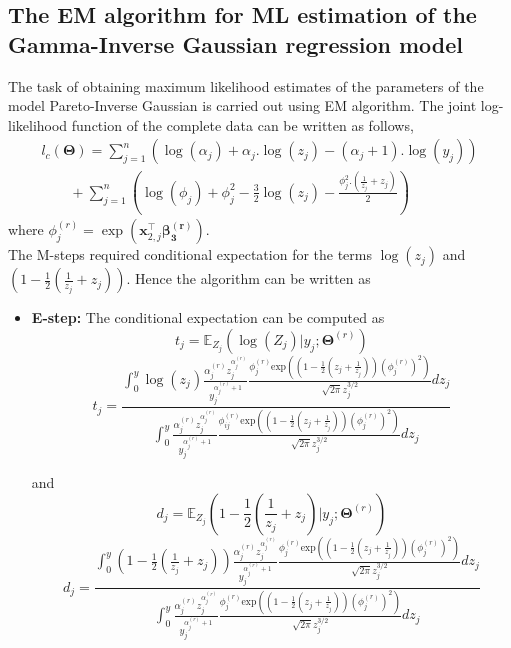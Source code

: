 \documentclass[12pt]{article}%
\theoremstyle{definition}
\theoremstyle{remark}
\begin{document}
{\subsection{The EM algorithm for ML estimation of the Gamma-Inverse Gaussian regression model}
The task of obtaining maximum likelihood estimates of the parameters of the model Pareto-Inverse Gaussian is carried out using EM algorithm. The joint log-likelihood function of the complete data can be written as follows,
\begin{multline}
	l_{c}(\mathbf{\Theta})=\sum_{j=1}^{n}\left(\log(\alpha_{j})+\alpha_{j}.\log(z_{j})-(\alpha_{j}+1).\log(y_{j})\right)\\
	\quad \quad + \sum_{j=1}^{n} \left(\log(\phi_{j})+\phi_{j}^{2}-\frac{3}{2}\log(z_{j})-\frac{\phi_{j}^{2}.\left(\frac{1}{z_{j}}+z_{j}\right)}{2}\right)
	\label{lle}
\end{multline}
where $\phi^{(r)}_{j}=\exp(\mathbf{x}_{2,j}^{\top}\boldsymbol{\beta_{3}^{(r)}})$.\\
The M-steps required conditional expectation for the terms $\log(z_{j})$ and $\left(1-\frac{1}{2}\left(\frac{1}{z_{j}}+z_{j}\right)\right)$. Hence the algorithm can be written as
\begin{itemize}
	\item \textbf{E-step:} The conditional expectation can be computed as
	\begin{equation*}
		t_{j}=\mathbb{E}_{Z_{j}}\left(\log(Z_{j})|y_{j};\mathbf{\Theta}^{(r)}\right)
	\end{equation*}
	\begin{equation}
		t_{j}=\frac{\int_0^y \log(z_{j}) \frac{\alpha_{j}^{(r)} z_{j}^{\alpha_{j}^{(r)}} }{y_{j}^{\alpha_{j}^{(r)} +1}} \frac{\phi_{j}^{(r)} \text{exp}\left({\left(1-\frac{1}{2} \left(z_{j}+\frac{1}{z_{j}}\right)\right) (\phi_{j}^{(r)})^2}\right)}{\sqrt{2 \pi } z_{j}^{3/2}} dz_{j}}{\int_0^y  \frac{\alpha_{j}^{(r)} z_{j}^{\alpha_{j}^{(r)}} }{y_{j}^{\alpha_{j}^{(r)} +1}} \frac{\phi_{ij}^{(r)} \text{exp}\left({\left(1-\frac{1}{2} \left(z_{j}+\frac{1}{z_{j}}\right)\right) (\phi_{j}^{(r)}) ^2}\right)}{\sqrt{2 \pi } z_{j}^{3/2}} dz_{j}}
	\end{equation}
	
	and
	\begin{equation*}
		d_{j}=\mathbb{E}_{Z_{j}}\left(1-\frac{1}{2}\left(\frac{1}{z_{j}}+z_{j}\right)|y_{j};\mathbf{\Theta}^{(r)}\right)
	\end{equation*}
	\begin{equation}
		d_{j}=\frac{\int_0^y \left(1-\frac{1}{2}\left(\frac{1}{z_{j}}+z_{j}\right)\right) \frac{\alpha_{j}^{(r)} z_{j}^{\alpha_{j}^{(r)}} }{y_{j}^{\alpha_{j}^{(r)} +1}} \frac{\phi_{j}^{(r)} \text{exp}\left({\left(1-\frac{1}{2} \left(z_{j}+\frac{1}{z_{j}}\right)\right) (\phi_{j}^{(r)})^2}\right)}{\sqrt{2 \pi } z_{j}^{3/2}} dz_{j}}{\int_0^y  \frac{\alpha_{j}^{(r)} z_{j}^{\alpha_{j}^{(r)}} }{y_{j}^{\alpha_{j}^{(r)} +1}} \frac{\phi_{j}^{(r)} \text{exp}\left({\left(1-\frac{1}{2} \left(z_{j}+\frac{1}{z_{j}}\right)\right) (\phi_{j}^{(r)}) ^2}\right)}{\sqrt{2 \pi } z_{j}^{3/2}} dz_{j}}
	\end{equation}
	

\end{itemize}}
\end{document}
